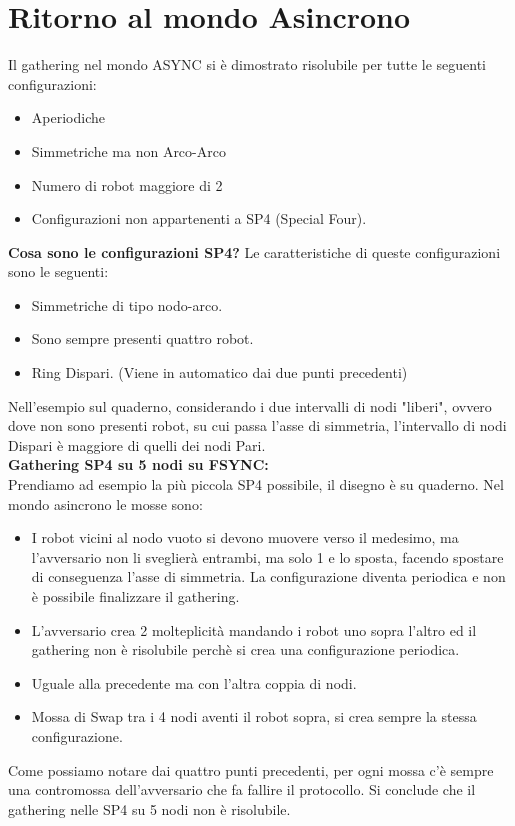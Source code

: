 \section{Ritorno al mondo Asincrono}
Il gathering nel mondo ASYNC si è dimostrato risolubile per tutte le seguenti
configurazioni:
\begin{itemize}
    \item Aperiodiche
    \item Simmetriche ma non Arco-Arco
    \item Numero di robot maggiore di 2
    \item Configurazioni non appartenenti a SP4 (Special Four).
\end{itemize}
\textbf{Cosa sono le configurazioni SP4?} Le caratteristiche di queste
configurazioni sono le seguenti:
\begin{itemize}
    \item Simmetriche di tipo nodo-arco.
    \item Sono sempre presenti quattro robot.
    \item Ring Dispari. (Viene in automatico dai due punti precedenti)
\end{itemize}{}
Nell'esempio sul quaderno, considerando i due intervalli di nodi "liberi",
ovvero dove non sono presenti robot, su cui passa l'asse di simmetria,
l'intervallo di nodi Dispari è maggiore di quelli dei nodi Pari.\\

\textbf{Gathering SP4 su 5 nodi su FSYNC:}\\
Prendiamo ad esempio la più piccola SP4 possibile, il disegno è su quaderno. Nel
mondo asincrono le mosse sono:
\begin{itemize}
    \item I robot vicini al nodo vuoto si devono muovere verso il medesimo, ma
          l'avversario non li sveglierà entrambi, ma solo 1 e lo sposta, facendo
          spostare di conseguenza l'asse di simmetria. La configurazione diventa
          periodica e non è possibile finalizzare il gathering.
    \item L'avversario crea 2 molteplicità mandando i robot uno sopra l'altro ed
          il gathering non è risolubile perchè si crea una configurazione periodica.
    \item Uguale alla precedente ma con l'altra coppia di nodi.
    \item Mossa di Swap tra i 4 nodi aventi il robot sopra, si crea sempre la
          stessa configurazione.
\end{itemize}
Come possiamo notare dai quattro punti precedenti, per ogni mossa c'è sempre una
contromossa dell'avversario che fa fallire il protocollo. Si conclude che il
gathering nelle SP4 su 5 nodi non è risolubile.\\

